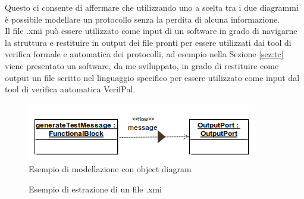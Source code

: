 \noindent Questo ci consente di affermare che utilizzando uno a scelta tra i due diagrammi è possibile modellare un protocollo senza la perdita di alcuna informazione.\\
Il file .xmi può essere utilizzato come input di un software in grado di navigarne la struttura e restituire in output dei file pronti per essere utilizzati dai tool di verifica formale e automatica dei protocolli, ad esempio nella Sezione \ref{sez:tc} viene presentato un software, da me sviluppato, in grado di restituire come output un file scritto nel linguaggio specifico per essere utilizzato come input dal tool di verifica automatica VerifPal.

\begin{figure}[h!]
    \centering
    \includegraphics[scale=0.6]{../xmi/ex.png} 
    \caption{Esempio di modellazione con object diagram}
    \label{fig:exUML}
\end{figure}

\begin{figure} [h!]
    \centering
    
    \caption{Esempio di estrazione di un file .xmi}
\end{figure}

\clearpage
